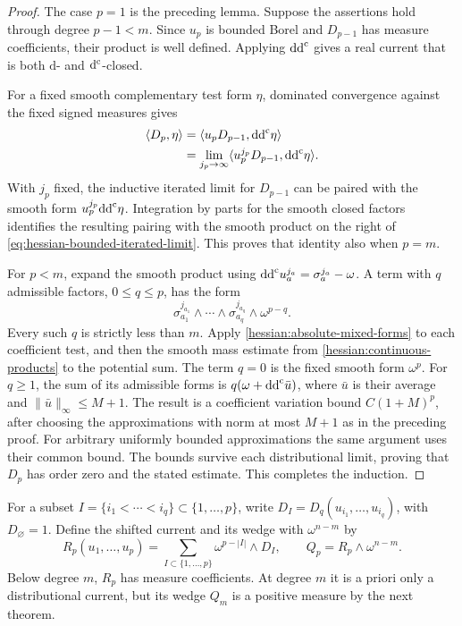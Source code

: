 \begin{proof}
The case $p=1$ is the preceding lemma. Suppose the assertions hold
through degree $p-1<m$. Since $u_p$ is bounded Borel and $D_{p-1}$
has measure coefficients, their product is well defined. Applying
$\mathrm{dd}^{\mathrm{c}}$ gives a real current that is both $\mathrm d$- and
$\mathrm d^{\mathrm c}$-closed.

For a fixed smooth complementary test form $\eta$, dominated
convergence against the fixed signed measures gives
\[
 \begin{aligned}
 \langle D_p,\eta\rangle
 &=\langle u_pD_{p-1},\mathrm{dd}^{\mathrm{c}}\eta\rangle\\
 &=\lim_{j_p\to\infty}
       \langle u_p^{j_p}D_{p-1},\mathrm{dd}^{\mathrm{c}}\eta\rangle.
 \end{aligned}
\]
With $j_p$ fixed, the inductive iterated limit for $D_{p-1}$ can be
paired with the smooth form $u_p^{j_p}\mathrm{dd}^{\mathrm{c}}\eta$. Integration by parts
for the smooth closed factors identifies the resulting pairing with
the smooth product on the right of
\eqref{eq:hessian-bounded-iterated-limit}. This proves that identity
also when $p=m$.

For $p<m$, expand the smooth product using
$\mathrm{dd}^{\mathrm{c}} u_a^{j_a}=\sigma_a^{j_a}-\omega$. A term with $q$ admissible
factors, $0\leq q\leq p$, has the form
\[
 \sigma_{a_1}^{j_{a_1}}\wedge\cdots\wedge
 \sigma_{a_q}^{j_{a_q}}\wedge\omega^{p-q}.
\]
Every such $q$ is strictly less than $m$. Apply
\cref{hessian:absolute-mixed-forms} to each coefficient test, and then
the smooth mass estimate from \cref{hessian:continuous-products} to
the potential sum. The term $q=0$ is the fixed smooth form $\omega^p$.
For $q\geq1$, the sum of its admissible forms is
$q(\omega+\mathrm{dd}^{\mathrm{c}}\bar u)$, where $\bar u$ is their average and
$\|\bar u\|_\infty\leq M+1$. The result is a
coefficient variation bound $C(1+M)^p$, after choosing the
approximations with norm at most $M+1$ as in the preceding proof.
For arbitrary uniformly bounded approximations the same argument
uses their common bound. The bounds survive each distributional
limit, proving that $D_p$ has order zero and the stated estimate.
This completes the induction.
\end{proof}

For a subset $I=\{i_1<\cdots<i_q\}\subset\{1,\ldots,p\}$, write
$D_I=D_q(u_{i_1},\ldots,u_{i_q})$, with $D_\varnothing=1$.
Define the shifted current and its wedge with $\omega^{n-m}$ by
\begin{equation}\label{eq:hessian-bounded-shifted-current}
 R_p(u_1,\ldots,u_p)
 =\sum_{I\subset\{1,\ldots,p\}}\omega^{p-|I|}\wedge D_I,
 \qquad Q_p=R_p\wedge\omega^{n-m}.
\end{equation}
Below degree $m$, $R_p$ has measure coefficients. At degree $m$ it
is a priori only a distributional current, but its wedge $Q_m$ is a
positive measure by the next theorem.

